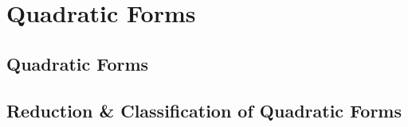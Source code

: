 \chapter{Quadratic Forms}
\section{Quadratic Forms}

\section{Reduction \& Classification of Quadratic Forms}


